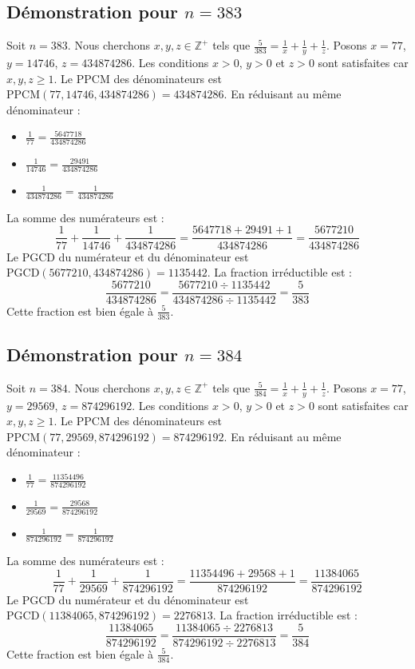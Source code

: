 \documentclass[11pt,a4paper]{article}
\begin{document}
\subsection{Démonstration pour $n = 383$}
Soit $n = 383$. Nous cherchons $x, y, z \in \mathbb{Z}^{+}$ tels que $\frac{5}{383} = \frac{1}{x} + \frac{1}{y} + \frac{1}{z}$.
Posons $x = 77$, $y = 14746$, $z = 434874286$.
Les conditions $x > 0$, $y > 0$ et $z > 0$ sont satisfaites car $x, y, z \geq 1$.
Le PPCM des dénominateurs est $\text{PPCM}(77, 14746, 434874286) = 434874286$.
En réduisant au même dénominateur :
\begin{itemize}
    \item $\frac{1}{77} = \frac{5647718}{434874286}$
    \item $\frac{1}{14746} = \frac{29491}{434874286}$
    \item $\frac{1}{434874286} = \frac{1}{434874286}$
\end{itemize}
La somme des numérateurs est :
$$ \frac{1}{77} + \frac{1}{14746} + \frac{1}{434874286} = \frac{5647718 + 29491 + 1}{434874286} = \frac{5677210}{434874286} $$
Le PGCD du numérateur et du dénominateur est $\text{PGCD}(5677210, 434874286) = 1135442$.
La fraction irréductible est :
$$ \frac{5677210}{434874286} = \frac{5677210 \div 1135442}{434874286 \div 1135442} = \frac{5}{383} $$
Cette fraction est bien égale à $\frac{5}{383}$.

\subsection{Démonstration pour $n = 384$}
Soit $n = 384$. Nous cherchons $x, y, z \in \mathbb{Z}^{+}$ tels que $\frac{5}{384} = \frac{1}{x} + \frac{1}{y} + \frac{1}{z}$.
Posons $x = 77$, $y = 29569$, $z = 874296192$.
Les conditions $x > 0$, $y > 0$ et $z > 0$ sont satisfaites car $x, y, z \geq 1$.
Le PPCM des dénominateurs est $\text{PPCM}(77, 29569, 874296192) = 874296192$.
En réduisant au même dénominateur :
\begin{itemize}
    \item $\frac{1}{77} = \frac{11354496}{874296192}$
    \item $\frac{1}{29569} = \frac{29568}{874296192}$
    \item $\frac{1}{874296192} = \frac{1}{874296192}$
\end{itemize}
La somme des numérateurs est :
$$ \frac{1}{77} + \frac{1}{29569} + \frac{1}{874296192} = \frac{11354496 + 29568 + 1}{874296192} = \frac{11384065}{874296192} $$
Le PGCD du numérateur et du dénominateur est $\text{PGCD}(11384065, 874296192) = 2276813$.
La fraction irréductible est :
$$ \frac{11384065}{874296192} = \frac{11384065 \div 2276813}{874296192 \div 2276813} = \frac{5}{384} $$
Cette fraction est bien égale à $\frac{5}{384}$.
\end{document}
